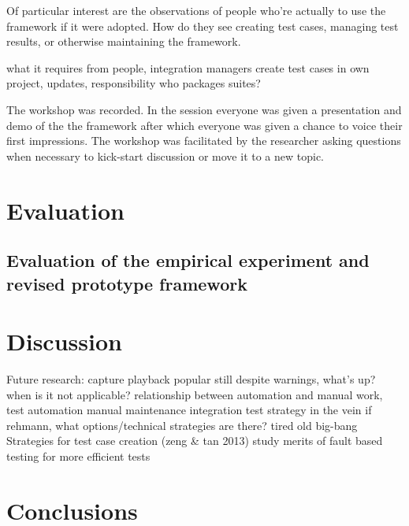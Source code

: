 \documentclass[12pt,a4paper,oneside,pdftex]{report}
\begin{document}
{{Of particular interest are the observations of people who're actually to use the framework if it were adopted. How do they see creating test cases, managing test results, or otherwise maintaining the framework. 

what it requires from people, integration managers create test cases in own project, updates, responsibility
who packages suites?

The workshop was recorded. In the session everyone was given a presentation and demo of the the framework after which everyone was given a chance to voice their first impressions. The workshop was facilitated by the researcher asking questions when necessary to kick-start discussion or move it to a new topic.




\chapter{Evaluation}
\label{chapter:evaluation}

\section{Evaluation of the empirical experiment and revised prototype framework}

\chapter{Discussion}
\label{chapter:discussion}

Future research:
capture playback popular still despite warnings, what's up? when is it not applicable?
relationship between automation and manual work, test automation manual maintenance
integration test strategy in the vein if rehmann, what options/technical strategies are there? tired old big-bang
Strategies for test case creation (zeng & tan 2013)
study merits of fault based testing for more efficient tests

\chapter{Conclusions}
\label{chapter:conclusions}

}}
\end{document}
